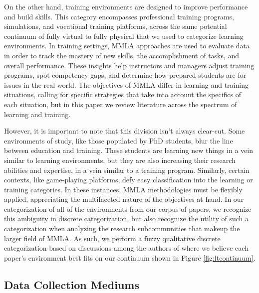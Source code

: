 \documentclass[manuscript,screen,review]{acmart}
\begin{document}
On the other hand, training environments are designed to improve performance and build skills. This category encompasses professional training programs, simulations, and vocational training platforms, across the same potential continuum of fully virtual to fully physical that we used to categorize learning environments. In training settings, MMLA approaches are used to evaluate data in order to track the mastery of new skills, the accomplishment of tasks, and overall performance. These insights help instructors and managers adjust training programs, spot competency gaps, and determine how prepared students are for issues in the real world. The objectives of MMLA differ in learning and training situations, calling for specific strategies that take into account the specifics of each situation, but in this paper we review literature across the spectrum of learning and training.

However, it is important to note that this division isn't always clear-cut. Some environments of study, like those populated by PhD students, blur the line between education and training. These students are learning new things in a vein similar to learning environments, but they are also increasing their research abilities and expertise, in a vein similar to a training program. Similarly, certain contexts, like game-playing platforms, defy easy classification into the learning or training categories. In these instances, MMLA methodologies must be flexibly applied, appreciating the multifaceted nature of the objectives at hand. In our categorization of all of the environments from our corpus of papers, we recognize this ambiguity in discrete categorization, but also recognize the utility of such a categorization when analyzing the research subcommunities that makeup the larger field of MMLA. As such, we perform a fuzzy qualitative discrete categorization based on discussions among the authors of where we believe each paper’s environment best fits on our continuum shown in Figure \ref{fig:ltcontinuum}.

\subsection{Data Collection Mediums} 
\end{document}
